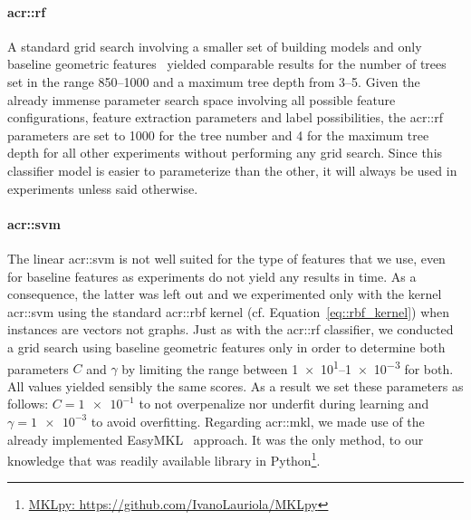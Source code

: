             \paragraph{\acrshort*{acr::rf}}
                A standard grid search involving a smaller set of building models and only baseline geometric features~\parencite{ennafii2018qualificationunannotated} yielded comparable results for the number of trees set in the range \numrange{850}{1000} and a maximum tree depth from \numrange{3}{5}.
                Given the already immense parameter search space involving all possible feature configurations, feature extraction parameters and label possibilities, the \gls{acr::rf} parameters are set to \num{1000} for the tree number and 4 for the maximum tree depth for all other experiments without performing any grid search.
                Since this classifier model is easier to parameterize than the other, it will always be used in experiments unless said otherwise.

            \paragraph{\acrshort*{acr::svm}}
                The linear \gls{acr::svm} is not well suited for the type of features that we use, even for baseline features as experiments do not yield any results in time.
                As a consequence, the latter was left out and we experimented only with the kernel \gls{acr::svm} using the standard \gls{acr::rbf} kernel (cf. Equation~\ref{eq::rbf_kernel}) when instances are vectors not graphs.
                Just as with the \gls{acr::rf} classifier, we conducted a grid search using baseline geometric features only in order to determine both parameters \(C\) and \(\gamma\) by limiting the range between \numrange[range-phrase={ and }, scientific-notation = true]{1e1}{1e-3} for both.
                All values yielded sensibly the same scores.
                As a result we set these parameters as follows: \(C = \num[scientific-notation = true]{1e-1}\) to not overpenalize nor underfit during learning and \(\gamma = \num[scientific-notation = true]{1e-3}\) to avoid overfitting.
                Regarding \gls{acr::mkl}, we made use of the already implemented EasyMKL~\parencite{aiolli2015easymkl} approach.
                It was the only method, to our knowledge that was readily available library in Python\footnote{\href{https://github.com/IvanoLauriola/MKLpy}{MKLpy: https://github.com/IvanoLauriola/MKLpy}}.
    
